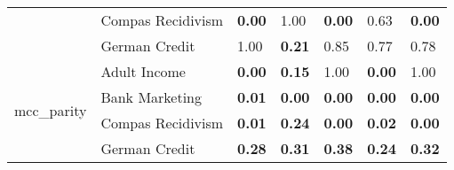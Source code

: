 \begin{tabular}{lllllll}
 & Compas Recidivism & \textbf{0.00} & 1.00 & \textbf{0.00} & 0.63 & \textbf{0.00} \\
 & German Credit & 1.00 & \textbf{0.21} & 0.85 & 0.77 & 0.78 \\
\cline{1-7}
\multirow[t]{4}{*}{mcc_parity} & Adult Income & \textbf{0.00} & \textbf{0.15} & 1.00 & \textbf{0.00} & 1.00 \\
 & Bank Marketing & \textbf{0.01} & \textbf{0.00} & \textbf{0.00} & \textbf{0.00} & \textbf{0.00} \\
 & Compas Recidivism & \textbf{0.01} & \textbf{0.24} & \textbf{0.00} & \textbf{0.02} & \textbf{0.00} \\
 & German Credit & \textbf{0.28} & \textbf{0.31} & \textbf{0.38} & \textbf{0.24} & \textbf{0.32} \\
\cline{1-7}
\bottomrule
\end{tabular}

